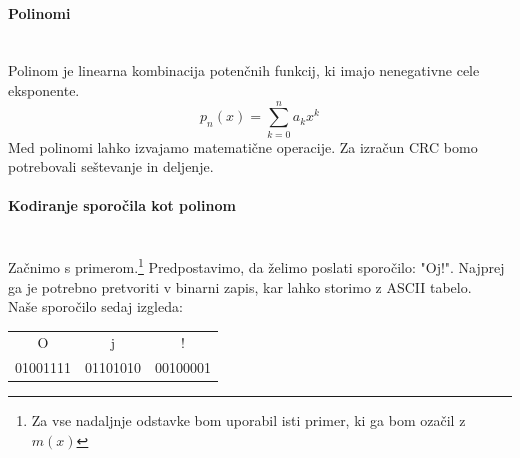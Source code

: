 \documentclass[12pt]{article}
\begin{document}
            \paragraph{Polinomi} \mbox{}\\
                Polinom je linearna kombinacija potenčnih funkcij, ki imajo 
                nenegativne cele eksponente.
                \begin{equation}
                    p_n (x) = \sum_{k=0}^n a_kx^k
                \end{equation}
                Med polinomi lahko izvajamo matematične operacije. Za izračun
                CRC bomo potrebovali seštevanje in deljenje. 
            
            \paragraph{Kodiranje sporočila kot polinom} \mbox{}\\
                Začnimo s primerom.\footnote{Za vse nadaljnje odstavke bom 
                uporabil isti primer, ki ga bom ozačil z $m(x)$} 
                Predpostavimo, da želimo poslati sporočilo: "Oj!". Najprej ga je
                potrebno pretvoriti v binarni zapis, kar lahko storimo z ASCII
                tabelo.\\
                Naše sporočilo sedaj izgleda:

                \begin{table}[h!]
                    \centering
                    \begin{tabular}{ccc}
                    O        & j        & !        \\
                    01001111 & 01101010 & 00100001
                    \end{tabular}
                \end{table}
\end{document}
